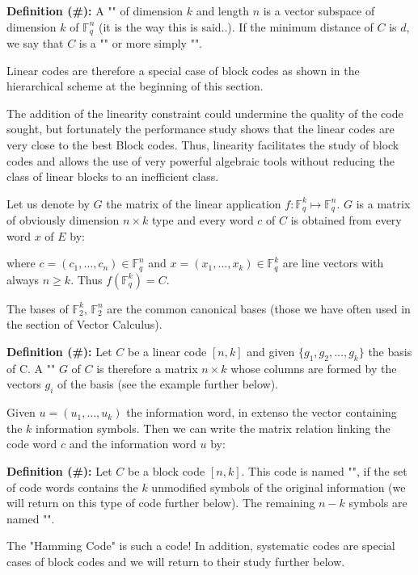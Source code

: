 	\textbf{Definition (\#\mydef):} A "" of dimension $k$ and length $n$ is a vector subspace of dimension $k$ of $\mathbb{F}_q^n$ (it is the way this is said..). If the minimum distance of $C$ is $d$, we say that $C$ is a "" or more simply "".
	
	\begin{tcolorbox}[title=Remark,colframe=black,arc=10pt]
	Linear codes are therefore a special case of block codes as shown in the hierarchical scheme at the beginning of this section.
	\end{tcolorbox}
	The addition of the linearity constraint could undermine the quality of the code sought, but fortunately the performance study shows that the linear codes are very close to the best Block codes. Thus, linearity facilitates the study of block codes and allows the use of very powerful algebraic tools without reducing the class of linear blocks to an inefficient class.
	
	Let us denote by $G$ the matrix of the linear application $f:\mathbb{F}_q^k \mapsto \mathbb{F}_q^n$. $G$ is a matrix of obviously dimension $n\times k$ type and every word $c$ of $C$ is obtained from every word $x$ of $E$ by:
	
	where $c=(c_1,\ldots,c_n)\in\mathbb{F}_q^n$ and $x=(x_1,\ldots,x_k)\in\mathbb{F}_q^k$ are line vectors with always $n\ge k$. Thus $f(\mathbb{F}_q^k)=C$.
	\begin{tcolorbox}[title=Remark,colframe=black,arc=10pt]
	The bases of $\mathbb{F}_2^k$, $\mathbb{F}_2^n$ are the common canonical bases (those we have often used in the section of Vector Calculus).
	\end{tcolorbox}
	
	\textbf{Definition (\#\mydef):} Let $C$ be a linear code $[n, k]$ and given $\{g_1,g_2,\ldots,g_k\}$ the basis of C. A "" $G$ of $C$ is therefore a matrix $n\times k$ whose columns are formed by the vectors $g_i$ of the basis (see the example further below).

	Given $u=(u_1,\ldots,u_k)$ the information word, in extenso the vector containing the $k$ information symbols. Then we can write the matrix relation linking the code word $c$ and the information word $u$ by:
	
	
	\textbf{Definition (\#\mydef):} Let $C$ be a block code $[n, k]$. This code is named "", if the set of code words contains the $k$ unmodified symbols of the original information (we will return on this type of code further below). The remaining $n-k$ symbols are named "".
	\begin{tcolorbox}[title=Remark,colframe=black,arc=10pt]
	The "Hamming Code" is such a code! In addition, systematic codes are special cases of block codes and we will return to their study further below.
	\end{tcolorbox}
	
